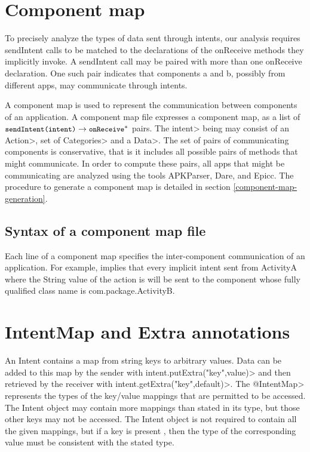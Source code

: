 \section{Component map}
To precisely analyze the types of data sent through intents, our analysis
requires sendIntent calls to be matched to the declarations of the onReceive
methods they implicitly invoke. A sendIntent call may be paired
with more than one onReceive declaration. One such pair indicates that 
components a and b, possibly from different apps, may communicate through 
intents. 

A component map is used to represent the communication between components of an
application. A component map file expresses a 
component map, as a list of $\flow{\|sendIntent(intent)|}{\|onReceive|^*}$ pairs.
The \<intent> being may consist of an \<Action>, set of
\<Categories> and a \<Data>.
The set of pairs of communicating components is
conservative, that is it includes all possible pairs of methods that might
communicate. In order to compute these pairs, all apps that might be
communicating are analyzed using the tools APKParser, Dare, and Epicc. The
procedure to generate a component map is detailed in section
\ref{component-map-generation}.


\subsection{Syntax of a component map file}
Each line of a component map specifies the inter-component communication of
an application. For example,  
implies that every implicit intent sent from ActivityA where the String value of
the action is  will
be sent to the component whose fully qualified class name is com.package.ActivityB.


\section{IntentMap and Extra annotations}
An Intent contains a map from string keys to arbitrary values. Data can be added
to this map by the sender with \<intent.putExtra("key",value)> and then
retrieved by the receiver with \<intent.getExtra("key",default)>. 
The \<@IntentMap> represents the types
of the key/value mappings that are permitted to be accessed. The Intent object
may contain more mappings than stated in its type, but those other keys may not
be accessed. The Intent object is not required to contain all the given
mappings, but if a key is present , then the type of the corresponding value must
be consistent with the stated type. 

